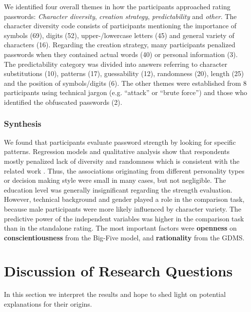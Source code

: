 We identified four overall themes in how the participants approached rating passwords: \textit{Character diversity}, \textit{creation strategy}, \textit{predictability} and \textit{other}. The character diversity code consists of participants mentioning the importance of symbols (69), digits (52), upper-/lowercase letters (45) and general variety of characters (16). Regarding the creation strategy, many participants penalized passwords when they contained actual words (40) or personal information (3). The predictability category was divided into answers referring to character substitutions (10), patterns (17), guessability (12), randomness (20), length (25) and the position of symbols/digits (6). The other themes were established from 8 participants using technical jargon (e.g. ``attack'' or ``brute force'') and those who identified the obfuscated passwords (2). 

\subsubsection{Synthesis}
We found that participants evaluate password strength by looking for specific patterns. Regression models and qualitative analysis show that respondents mostly penalized lack of diversity and randomness which is consistent with the related work \cite{Ur2016PerceptionsPassword}. Thus, the associations originating from different personality types or decision making style were small in many cases, but not negligible. The education level was generally insignificant regarding the strength evaluation. However, technical background and gender played a role in the comparison task, because male participants were more likely influenced by character variety. The predictive power of the independent variables was higher in the comparison task than in the standalone rating. The most important factors were \textbf{openness} on \textbf{conscientiousness} from the Big-Five model, and \textbf{rationality} from the GDMS. 



\section{Discussion of Research Questions}
In this section we interpret the results and hope to shed light on potential explanations for their origins. %

